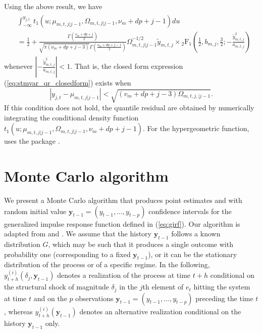 \documentclass[nojss]{jss}
\begin{document}
\begin{appendix}
Using the above result, we have
\begin{align}\label{eq:stmvar_qr_closedform}
\begin{aligned}
&\int_{-\infty}^{y_{j,t}}t_1(u;\mu_{m,t,j|j-1},\Omega_{m,t,j|j-1},\nu_m + dp + j - 1)du \\
&= \frac{1}{2} + \frac{\Gamma\left(\frac{\nu_m + dp + j}{2}\right)}{\sqrt{\pi (\nu_m + dp + j - 3)}\Gamma\left(\frac{\nu_m + dp + j - 1}{2} \right)}\Omega_{m,t,j|j-1}^{-1/2}\tilde{y}_{m,t,j} \times {}_2\text{F}_1\left(\frac{1}{2}, b_{m,j}, \frac{3}{2}; -\frac{\tilde{y}_{m,t,j}^2}{a_{m,t,j}} \right)
\end{aligned}
\end{align}
whenever $\left|-\frac{\tilde{y}_{m,t,j}^2}{a_{m,t,j}}\right|<1$.  That is,  the closed form expression (\ref{eq:stmvar_qr_closedform}) exists when
\begin{equation}
|y_{j,t} - \mu_{m,t,j|j-1}| < \sqrt{(v_m + dp + j - 3)\Omega_{m,t,j,|j-1}}.
\end{equation}
If this condition does not hold, the quantile residual are obtained by numerically integrating the conditional density function $t_1(u;\mu_{m,t,j|j-1},\Omega_{m,t,j|j-1},\nu_m + dp + j - 1)$. For the hypergeometric function,  uses the package  \citep{gsl}.


\section{Monte Carlo algorithm}\label{sec:montecarlo}
We present a Monte Carlo algorithm that produces point estimates and with random initial value $\boldsymbol{y}_{t-1}=(y_{t-1},...,y_{t-p})$ confidence intervals for the generalized impulse response function defined in (\ref{eq:girf}). Our algorithm is adapted from \citet[pp. 135-136]{Koop+Pesaran+Potter:1996} and \citet[pp. 601-602]{Kilian+Lutkepohl:2017}. We assume that the history $\boldsymbol{y}_{t-1}$ follows a known distribution $G$, which may be such that it produces a single outcome with probability one (corresponding to a fixed $\boldsymbol{y}_{t-1}$), or it can be the stationary distribution of the process or of a specific regime. In the following, $y_{t+h}^{(i)}(\delta_j,\boldsymbol{y}_{t-1})$ denotes a realization of the process at time $t+h$ conditional on the structural shock of magnitude $\delta_j$ in the $j$th element of $e_t$ hitting the system at time $t$ and on the $p$ observations $\boldsymbol{y}_{t-1}=(y_{t-1},...,y_{t-p})$ preceding the time $t$, whereas $y_{t+h}^{(i)}(\boldsymbol{y}_{t-1})$ denotes an alternative realization conditional on the history $\boldsymbol{y}_{t-1}$ only.


\end{appendix}
\end{document}
